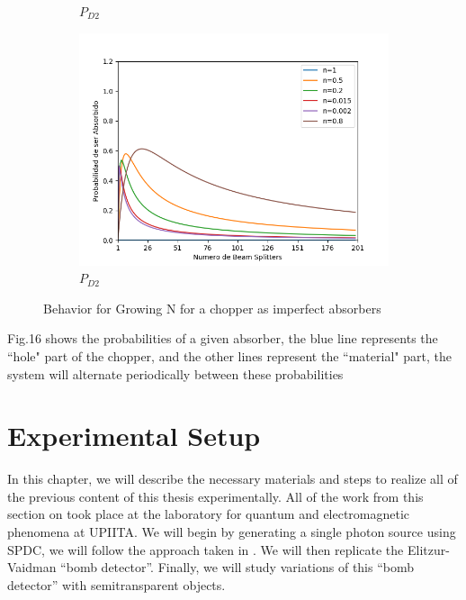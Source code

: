 \documentclass[12pt]{book}
\begin{document}
\begin{figure}[!htb]
\begin{subfigure}[b]{0.45\linewidth}
\caption{$P_{D2}$}
\label{fig:westminster_aerea}
\end{subfigure}
\begin{subfigure}[b]{0.45\linewidth}
\includegraphics[width=\linewidth]{images/Chopper_abs.png}
\caption{$P_{D2}$}
\label{fig:BS1}
\end{subfigure}
\caption{Behavior for Growing N for a chopper as imperfect absorbers}
\label{fig:westminster}
\end{figure}
 
\vspace{5 cm}

Fig.16 shows the probabilities of a given absorber, the blue line represents the ``hole" part of the chopper, and the other lines represent the ``material" part, the system will alternate periodically between these probabilities

\pagebreak

\section{Experimental Setup}
In this chapter, we will describe the necessary materials and steps to realize all of the previous content of this thesis experimentally. All of the work from this section on took place at the laboratory for quantum and electromagnetic phenomena at UPIITA. We will begin by generating a single photon source using SPDC, we will follow the approach taken in \cite{maestria_procopio}. We will then replicate the Elitzur-Vaidman ``bomb detector''. Finally, we will study variations of this ``bomb detector'' with semitransparent objects.
\end{document}
